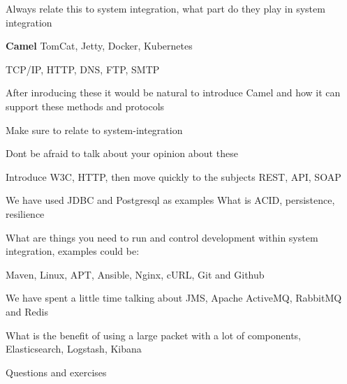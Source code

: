 \documentclass[Screen16to9,17pt]{foils}
\begin{document}
Always relate this to system integration, what part do they play in system integration







 {\bf Camel} TomCat, Jetty, Docker, Kubernetes



 TCP/IP, HTTP, DNS, FTP, SMTP

After inroducing these it would be natural to introduce Camel and how it can support these methods and protocols


Make sure to relate to system-integration

Dont be afraid to talk about your opinion about these



Introduce W3C, HTTP, then move quickly to the subjects REST, API, SOAP


We have used JDBC and Postgresql as examples
What is ACID, persistence, resilience


What are things you need to run and control development within system integration, examples could be:

Maven, Linux, APT, Ansible, Nginx, cURL, Git and Github


We have spent a little time talking about
JMS, Apache ActiveMQ, RabbitMQ and Redis


What is the benefit of using a large packet with a lot of components, Elasticsearch, Logstash, Kibana





Questions and exercises
\end{document}
